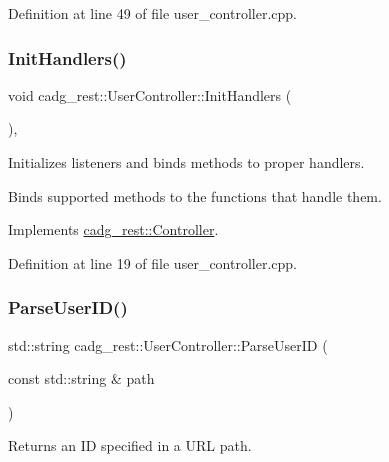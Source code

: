 Definition at line 49 of file user\+\_\+controller.\+cpp.

\mbox{\label{classcadg__rest_1_1_user_controller_a213210b1e1f8f7417133f3290fbb9b67}} 
\subsubsection{\texorpdfstring{InitHandlers()}{InitHandlers()}}
{\footnotesize\ttfamily void cadg\+\_\+rest\+::\+User\+Controller\+::\+Init\+Handlers (\begin{DoxyParamCaption}{ }\end{DoxyParamCaption})\hspace{0.3cm}{\ttfamily [override]}, {\ttfamily [virtual]}}



Initializes listeners and binds methods to proper handlers. 

Binds supported methods to the functions that handle them. 

Implements \mbox{\hyperlink{classcadg__rest_1_1_controller_a47b2c049207e02f407a55a64e2a2ce80}{cadg\+\_\+rest\+::\+Controller}}.



Definition at line 19 of file user\+\_\+controller.\+cpp.

\mbox{\label{classcadg__rest_1_1_user_controller_a3523d014f2ada4364034e175f6d645f8}} 
\subsubsection{\texorpdfstring{ParseUserID()}{ParseUserID()}}
{\footnotesize\ttfamily std\+::string cadg\+\_\+rest\+::\+User\+Controller\+::\+Parse\+User\+ID (\begin{DoxyParamCaption}\item[{const std\+::string \&}]{path }\end{DoxyParamCaption})}



Returns an ID specified in a U\+RL path. 

